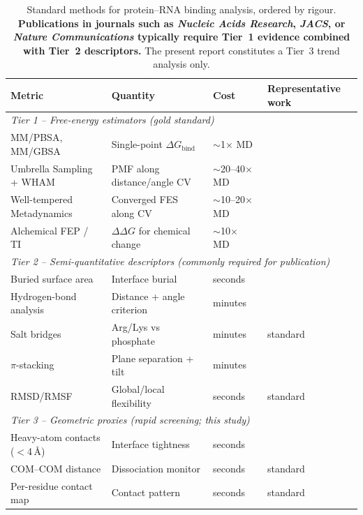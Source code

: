 \documentclass[11pt,a4paper]{article}
\begin{document}
\begin{table}[h]
\centering
\small
\renewcommand{\arraystretch}{1.15}
\begin{tabular}{p{4.4cm} p{3.6cm} p{3cm} p{3.2cm}}
\toprule
Metric & Quantity & Cost & Representative work \\
\midrule
\multicolumn{4}{l}{\textit{Tier 1 -- Free-energy estimators (gold standard)}} \\
\midrule
MM/PBSA, MM/GBSA       & Single-point $\Delta G_{\text{bind}}$ & $\sim$1$\times$ MD       & \citep{Wang2019,Wu2021} \\
Umbrella Sampling + WHAM & PMF along distance/angle CV       & $\sim$20--40$\times$ MD  & \citep{Lemkul2010} \\
Well-tempered Metadynamics & Converged FES along CV          & $\sim$10--20$\times$ MD  & \citep{Sutto2015} \\
Alchemical FEP / TI    & $\Delta\Delta G$ for chemical change & $\sim$10$\times$ MD      & \citep{Mey2020} \\
\midrule
\multicolumn{4}{l}{\textit{Tier 2 -- Semi-quantitative descriptors (commonly required for publication)}} \\
\midrule
Buried surface area    & Interface burial & seconds          & \citep{Janin1990} \\
Hydrogen-bond analysis & Distance + angle criterion & minutes & \citep{Krivov2014} \\
Salt bridges           & Arg/Lys vs phosphate & minutes      & standard \\
$\pi$-stacking         & Plane separation + tilt & minutes  & \citep{Wilson2014} \\
RMSD/RMSF              & Global/local flexibility & seconds  & standard \\
\midrule
\multicolumn{4}{l}{\textit{Tier 3 -- Geometric proxies (rapid screening; this study)}} \\
\midrule
Heavy-atom contacts ($<$4\,\si{\angstrom}) & Interface tightness & seconds & \citep{Kruse2017} \\
COM--COM distance      & Dissociation monitor & seconds      & standard \\
Per-residue contact map & Contact pattern & seconds         & standard \\
\bottomrule
\end{tabular}
\caption{Standard methods for protein--RNA binding analysis, ordered by
rigour. \textbf{Publications in journals such as \emph{Nucleic Acids Research},
\emph{JACS}, or \emph{Nature Communications} typically require Tier~1 evidence
combined with Tier~2 descriptors.} The present report constitutes a
Tier~3 trend analysis only.}
\label{tab:metrics}
\end{table}
\end{document}
